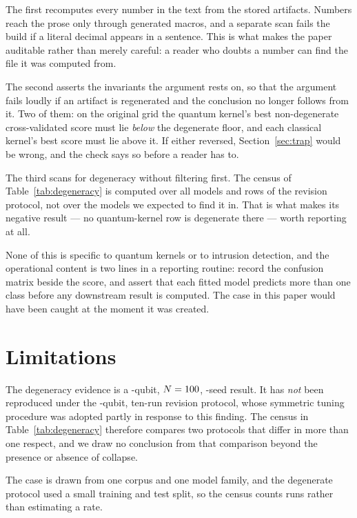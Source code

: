 \documentclass[runningheads]{llncs}
\begin{document}
The first recomputes every number in the text from the stored artifacts.
Numbers reach the prose only through generated macros, and a separate scan
fails the build if a literal decimal appears in a sentence. This is what
makes the paper auditable rather than merely careful: a reader who doubts a
number can find the file it was computed from.

The second asserts the invariants the argument rests on, so that the
argument fails loudly if an artifact is regenerated and the conclusion no
longer follows from it. Two of them: on the original grid the quantum
kernel's best non-degenerate cross-validated score must lie \emph{below} the
degenerate floor, and each classical kernel's best score must lie above it.
If either reversed, Section~\ref{sec:trap} would be wrong, and the check
says so before a reader has to.

The third scans for degeneracy without filtering first. The census of
Table~\ref{tab:degeneracy} is computed over all \prevModels{} models and
\prevRowsScanned{} rows of the revision protocol, not over the models we
expected to find it in. That is what makes its negative result --- no
quantum-kernel row is degenerate there --- worth reporting at all.

None of this is specific to quantum kernels or to intrusion detection, and
the operational content is two lines in a reporting routine: record the
confusion matrix beside the score, and assert that each fitted model
predicts more than one class before any downstream result is computed. The
case in this paper would have been caught at the moment it was created.

\section{Limitations}\label{sec:limits}

The degeneracy evidence is a \plegacyQubits-qubit, $N = 100$,
\plegacySeeds-seed result. It has \emph{not} been reproduced under the
\prevQubits-qubit, ten-run revision protocol, whose symmetric tuning procedure
was adopted partly in response to this finding. The census in
Table~\ref{tab:degeneracy} therefore compares two protocols that differ in
more than one respect, and we draw no conclusion from that comparison beyond
the presence or absence of collapse.

The case is drawn from one corpus and one model family, and the degenerate
protocol used a small training and test split, so the census counts runs
rather than estimating a rate.
\end{document}
